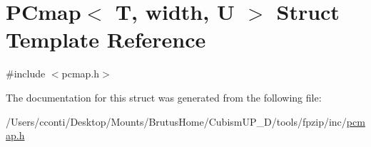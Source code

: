 \hypertarget{struct_p_cmap}{}\section{P\+Cmap$<$ T, width, U $>$ Struct Template Reference}
\label{struct_p_cmap}


{\ttfamily \#include $<$pcmap.\+h$>$}



The documentation for this struct was generated from the following file\+:\begin{DoxyCompactItemize}
\item 
/\+Users/cconti/\+Desktop/\+Mounts/\+Brutus\+Home/\+Cubism\+U\+P\+\_\+D/tools/fpzip/inc/\hyperlink{pcmap_8h}{pcmap.\+h}\end{DoxyCompactItemize}
